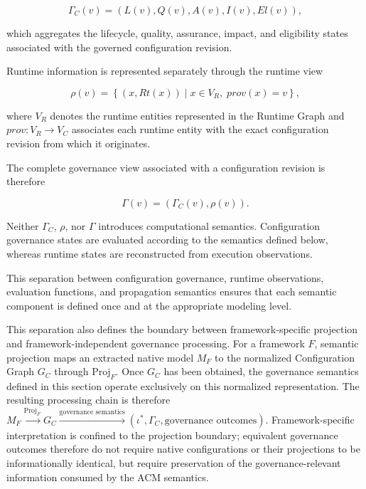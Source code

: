 \documentclass[10pt]{article}
\begin{document}
\begin{equation}
	\Gamma_C(v)=
	\left(
	L(v),
	Q(v),
	A(v),
	I(v),
	El(v)
	\right),
	\label{eq:configuration_governance_descriptor}
\end{equation}

which aggregates the lifecycle, quality, assurance, impact, and eligibility states associated with the governed configuration revision.

Runtime information is represented separately through the runtime view

\begin{equation}
	\rho(v)
	=
	\left\{
	(x,Rt(x))
	\mid
	x\in V_R,\;
	prov(x)=v
	\right\},
	\label{eq:runtime_view}
\end{equation}


where $V_R$ denotes the runtime entities represented in the Runtime Graph and $prov:V_R\rightarrow V_C$ associates each runtime entity with the exact configuration revision from which it originates.

The complete governance view associated with a configuration revision is therefore

\begin{equation}
	\Gamma(v)
	=
	\left(
	\Gamma_C(v),
	\rho(v)
	\right).
	\label{eq:complete_governance_descriptor}
\end{equation}


Neither $\Gamma_C$, $\rho$, nor $\Gamma$ introduces computational semantics. Configuration governance states are evaluated according to the semantics defined below, whereas runtime states are reconstructed from execution observations.

This separation between configuration governance, runtime observations, evaluation functions, and propagation semantics ensures that each semantic component is defined once and at the appropriate modeling level.

This separation also defines the boundary between framework-specific
projection and framework-independent governance processing. For a framework $F$, semantic projection maps an extracted native model $M_F$ to the normalized Configuration Graph $G_C$ through $\mathrm{Proj}_F$. Once $G_C$ has been obtained, the governance semantics defined in this section operate exclusively on this normalized representation. The resulting processing chain is therefore
$M_F \xrightarrow{\mathrm{Proj}_F} G_C
\xrightarrow{\text{governance semantics}}
(\iota^*,\Gamma_C,\text{governance outcomes})$.
Framework-specific interpretation is confined to the projection boundary;
equivalent governance outcomes therefore do not require native configurations or their projections to be informationally identical, but require preservation of the governance-relevant information consumed by the ACM semantics.
\end{document}
